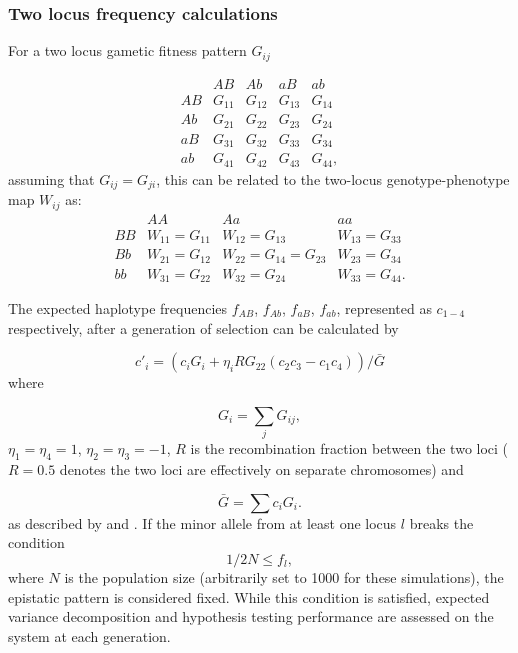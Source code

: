 \subsubsection{Two locus frequency calculations}

For a two locus gametic fitness pattern $G_{ij}$

\[
\begin{array}{lllll}
& AB & Ab & aB & ab \\
AB &	G_{11} &	G_{12} &	G_{13} &	G_{14} \\
Ab &	G_{21} &	G_{22} &	G_{23} &	G_{24} \\
aB &	G_{31} &	G_{32} &	G_{33} &	G_{34} \\
ab &	G_{41} &	G_{42} &	G_{43} &	G_{44}, \end{array}
\]
assuming that $G_{ij} = G_{ji}$, this can be related to the two-locus genotype-phenotype map $W_{ij}$ as:
\[
\begin{array}{cccc}
&	AA&	Aa&	aa\\
BB&	W_{11}=G_{11}&	W_{12}=G_{13}&	W_{13}=G_{33}\\
Bb&	W_{21}=G_{12}&	W_{22}=G_{14}=G_{23}&	W_{23}=G_{34}\\
bb&	W_{31}=G_{22}&	W_{32}=G_{24}&	W_{33}=G_{44}.\end{array}
\]

The expected haplotype frequencies $f_{AB}$, $f_{Ab}$, $f_{aB}$, $f_{ab}$, represented as $c_{1-4}$ respectively, after a generation of selection can be calculated by

\begin{equation}
{c}'_i =  (c_iG_i + \eta_i R G_{22} (c_2c_3-c_1c_4))\label{nextgen}/\bar{G}
\end{equation}
where

\begin{equation}
G_i = \sum_{j}G_{ij},
\end{equation}
$\eta_1 = \eta_4 = 1$, $\eta_2 = \eta_3 = -1$, $R$ is the recombination fraction between the two loci ($R = 0.5$ denotes the two loci are effectively on separate chromosomes)
and

\begin{equation}
\bar{G} = \sum c_iG_i.
\end{equation}
as described by \citet{Kimura1956} and \citet{Lewontin1960}. If the minor allele from at least one locus $l$ breaks the condition 
\begin{equation}
1/2N \leq f_{l},\label{fixcondition}
\end{equation}
where $N$ is the population size (arbitrarily set to 1000 for these simulations), the epistatic pattern is considered fixed. While this condition is satisfied, expected variance decomposition and hypothesis testing performance are assessed on the system at each generation.


